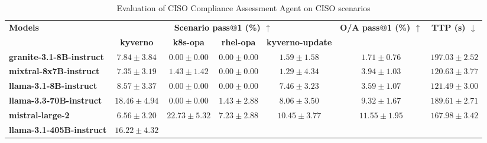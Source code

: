 \begin{table*}[h]
\small
\centering
\setlength{\tabcolsep}{4pt}
\begin{threeparttable}
  \caption{Evaluation of CISO Compliance Assessment Agent on CISO scenarios}
  \label{tab:cisoagent-eval}
  \begin{tabular}{@{}lcccccc@{}}
    \toprule
    \multirow{2}{*}{\textbf{Models}}
      & \multicolumn{4}{c}{\textbf{Scenario pass@1 (\%) $\uparrow$}}
      & \multirow{2}{*}{\textbf{O/A pass@1 (\%) $\uparrow$}} 
      & \multirow{2}{*}{\textbf{TTP (s) $\downarrow$}} \\
    \cmidrule(lr){2-5}
    & \textbf{kyverno}
    & \textbf{k8s-opa}
    & \textbf{rhel-opa}
    & \textbf{kyverno-update} \\
    \midrule
    \textbf{granite-3.1-8B-instruct} &
    \cellcolor[gray]{0.99} $7.84 \pm 3.84$ &
    \cellcolor[gray]{1.00} $0.00 \pm 0.00$ &
    \cellcolor[gray]{1.00} $0.00 \pm 0.00$ &
    \cellcolor[gray]{1.00} $1.59 \pm 1.58$ &
    \cellcolor[gray]{1.00} $1.71 \pm 0.76$ &
    \cellcolor[gray]{1.00} $197.03 \pm 2.52$ \\
    \textbf{mixtral-8x7B-instruct} &
    \cellcolor[gray]{1.00} $7.35 \pm 3.19$ &
    \cellcolor[gray]{1.00} $1.43 \pm 1.42$ &
    \cellcolor[gray]{1.00} $0.00 \pm 0.00$ &
    \cellcolor[gray]{1.00} $1.29 \pm 4.34$ &
    \cellcolor[gray]{0.99} $3.94 \pm 1.03$ &
    \cellcolor[gray]{0.88} $120.63 \pm 3.77$ \\
    \textbf{llama-3.1-8B-instruct} &
    \cellcolor[gray]{0.99} $8.57 \pm 3.37$ &
    \cellcolor[gray]{1.00} $0.00 \pm 0.00$ &
    \cellcolor[gray]{1.00} $0.00 \pm 0.00$ &
    \cellcolor[gray]{0.94} $7.46 \pm 3.23$ &
    \cellcolor[gray]{0.99} $3.59 \pm 1.07$ &
    \cellcolor[gray]{0.88} $121.49 \pm 3.00$ \\
    \textbf{llama-3.3-70B-instruct} &
    \cellcolor[gray]{0.95} $18.46 \pm 4.94$ &
    \cellcolor[gray]{1.00} $0.00 \pm 0.00$ &
    \cellcolor[gray]{0.99} $1.43 \pm 2.88$ &
    \cellcolor[gray]{0.94} $8.06 \pm 3.50$ &
    \cellcolor[gray]{0.95} $9.32 \pm 1.67$ &
    \cellcolor[gray]{0.99} $189.61 \pm 2.71$ \\
    \textbf{mistral-large-2} &
    \cellcolor[gray]{1.00} $6.56 \pm 3.20$ &
    \cellcolor[gray]{0.92} $22.73 \pm 5.32$ &
    \cellcolor[gray]{0.96} $7.23 \pm 2.88$ &
    \cellcolor[gray]{0.92} $10.45 \pm 3.77$ &
    \cellcolor[gray]{0.94} $11.55 \pm 1.95$ &
    \cellcolor[gray]{0.95} $167.98 \pm 3.42$ \\
    \textbf{llama-3.1-405B-instruct} &
    \cellcolor[gray]{0.96} $16.22 \pm 4.32$ &

\end{tabular}
\end{threeparttable}
\end{table*}
